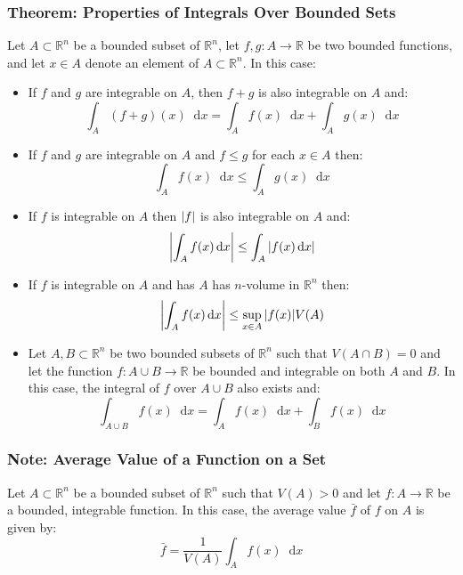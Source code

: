 \documentclass[11pt, a4paper]{article}
\newcommand{\diff}{\mathop{}\!\mathrm{d}} %
\begin{document}
\subsubsection{Theorem: Properties of Integrals Over Bounded Sets}
Let $ A  \subset \mathbb{R}^n $ be a bounded subset of $ \mathbb{R}^n $, let $ f, g : A \rightarrow \mathbb{R} $ be two bounded functions, and let $ x \in A $ denote an element of $ A \subset \mathbb{R}^n $. In this case:
\begin{itemize}
	\item If $ f $ and $ g$ are integrable on $ A $, then $ f + g $ is also integrable on $ A $ and:
	\begin{equation*}
		\int_A (f + g)(x)\diff x = \int_A f(x) \diff x + \int_A g(x)\diff x
	\end{equation*}
	
	\item If $ f $ and $ g $ are integrable on $ A $ and $ f \leq g$ for each $ x \in A $ then:
	\begin{equation*}
		\int_A f(x) \diff x \leq \int_A g(x) \diff x
	\end{equation*}
	
	\item If $ f $ is integrable on $ A $ then $ \abs{f} $ is also integrable on $ A $ and: 
	\begin{equation*}
		\abs{\int_A f(x) \diff x} \leq \int_A \abs{f(x)\diff x}
	\end{equation*}
	
	\item If $ f $ is integrable on $ A $ and has $ A $ has $ n $-volume in $ \mathbb{R}^n $ then:
	\begin{equation*}
		\abs{\int_A f(x) \diff x} \leq \sup_{x \in A}  \abs{f(x)} V(A)
	\end{equation*}
	
	\item Let $ A, B \subset  \mathbb{R}^n $ be two bounded subsets of $ \mathbb{R}^n $ such that $ V(A \cap B) = 0 $ and let the function $ f : A \cup B \rightarrow \mathbb{R} $ be bounded and integrable on both $ A $ and $ B $. In this case, the integral of $ f $ over $ A \cup B$ also exists and:
	\begin{equation*}
	\int_{A \cup B}f(x) \diff x = \int_A f(x)\diff x + \int_B f(x) \diff x
	\end{equation*}
\end{itemize}

\subsubsection{Note: Average Value of a Function on a Set}
Let $ A  \subset \mathbb{R}^n $ be a bounded subset of $ \mathbb{R}^n $ such that $ V(A) > 0 $ and let $ f : A \rightarrow \mathbb{R} $ be a bounded, integrable function. In this case, the average value $ \bar{f} $ of $ f $ on $ A $ is given by:
\begin{equation*}
	\bar{f} = \frac{1}{V(A)}\int_A f(x)\diff x
\end{equation*}
\end{document}

